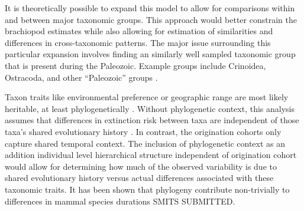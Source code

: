 \documentclass[12pt,letterpaper]{article}
\begin{document}
It is theoretically possible to expand this model to allow for comparisons within and between major taxonomic groups. This approach would better constrain the brachiopod estimates while also allowing for estimation of similarities and differences in cross-taxonomic patterns. The major issue surrounding this particular expansion involves finding an similarly well sampled taxonomic group that is present during the Paleozoic. Example groups include Crinoidea, Ostracoda, and other ``Paleozoic'' groups \citep{SepkoskiJr.1981a}.

Taxon traits like environmental preference or geographic range \citep{Jablonski1987,Hunt2005b} are most likely heritable, at least phylogenetically \citep{Lynch1991,Housworth2004}. Without phylogenetic context, this analysis assumes that differences in extinction risk between taxa are independent of those taxa's shared evolutionary history \citep{Felsenstein1985b}. In contrast, the origination cohorts only capture shared temporal context. The inclusion of phylogenetic context as an addition individual level hierarchical structure independent of origination cohort would allow for determining how much of the observed variability is due to shared evolutionary history versus actual differences associated with these taxonomic traits. It has been shown that phylogeny contribute non-trivially to differences in mammal species durations \uppercase{Smits Submitted}.


\end{document}
